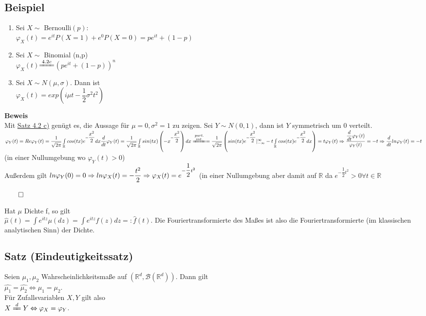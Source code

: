 \documentclass[german,10pt,oneside, fleqn, a4paper]{article}
\newcommand {\R}	{\mathbb{R}}
\newcommand{\Ra}	{\Rightarrow}
\newcommand{\LRa}{\Leftrightarrow}
\newcommand{\brc}[1]{\left(#1\right)}
\newcommand{\QED}{\begin{flushright}$\qed$\end{flushright}}
\newcommand{\mc}[1]{\mathcal{#1}}
\newcommand{\beweis}{\textbf{Beweis}\\}
\newcommand{\1}[1]{1_{#1}}
\newcommand{\2}[1]{\1{\brac{#1}}}
\newcommand{\rbor}[1][d]{\brc{\R^{#1},\mc{B}\brc{\R^{#1}}}}
\begin{document}
\subsection{Beispiel}
\label{4.4}
\begin{enumerate}
\item Sei $X\sim$ Bernoulli$(p)$:\\
$\varphi_X(t)=e^{it}P(X=1)+e^0P(X=0)=pe^{it}+(1-p)$
\item Sei $X\sim$ Binomial (n,p)\\
$\varphi_X(t)$\hyperref[4.2]{$\xlongequal{4.2 c}$}$(pe^{it}+(1-p))^n$
\item Sei $X\sim N(\mu,\sigma).$ Dann ist\\
$\varphi_X(t)=exp\brc{i\mu t-\dfrac{1}{2}\sigma^2t^2}$
\end{enumerate}
\beweis
Mit \hyperref[4.2]{Satz 4.2 c)} genügt es, die Aussage für $\mu=0, \sigma^2=1$ zu zeigen. Sei $Y\sim N(0,1)$, dann ist $Y$ symmetrisch um 0 verteilt.
$\varphi_Y(t)=Re\varphi_Y(t)=\dfrac{1}{\sqrt{2\pi}}\int\limits_\R cos(tx)e^{-\dfrac{x^2}{2}}dx\\
\dfrac{d}{dt}\varphi_Y(t)=\dfrac{1}{\sqrt{2\pi}}\int\limits_\R sin(tx)\brc{-x^{-\dfrac{x^2}{2}}}dx\\
\xlongequal{\substack{part.\\int.}}=\dfrac{1}{\sqrt{2\pi}}\brc{sin(tx)e^{-\dfrac{x^2}{2}}|_{-\infty}^\infty-t\int\limits_\R cos(tx)e^{-\dfrac{x^2}{2}}dx}=t\varphi_Y(t)\\
\Ra \dfrac{\dfrac{d}{dt}\varphi_Y(t)}{\varphi_Y(t)}=-t\\
\Ra\dfrac{d}{dt}ln\varphi_Y(t)=-t $(in einer Nullumgebung wo $\varphi_Y(t)>0$)\\
Außerdem gilt $ln\varphi_Y(0)=0\\
\Ra ln\varphi_X(t)=-\dfrac{t^2}{2}\\
\Ra \varphi_X(t)=e^{-\dfrac{1}{2}t^2}$ (in einer Nullumgebung aber damit auf $\R$ da $e^{-\dfrac{1}{2}t^2}>0\forall t\in\R$\QED
Hat $\mu$ Dichte f, so gilt\\
$\widehat\mu(t)=\int e^{itz}\mu(dz)=\int e^{itz}f(z)dz=:\widehat{f}(t)$.
Die Fouriertransformierte des Maßes ist also die Fouriertransformierte (im klassischen analytischen Sinn) der Dichte.

\subsection{Satz (Eindeutigkeitssatz)}
\label{4.5}
Seien $\mu_1,\mu_2$ Wahrscheinlichkeitsmaße auf $\rbor$. Dann gilt \\
$\widehat{\mu_1}=\widehat{\mu_2}\LRa\mu_1=\mu_2$.\\
Für Zufallsvariablen $X,Y$ gilt also\\
$X\xlongequal{d}Y\LRa \varphi_X=\varphi_Y$.
\end{document}
